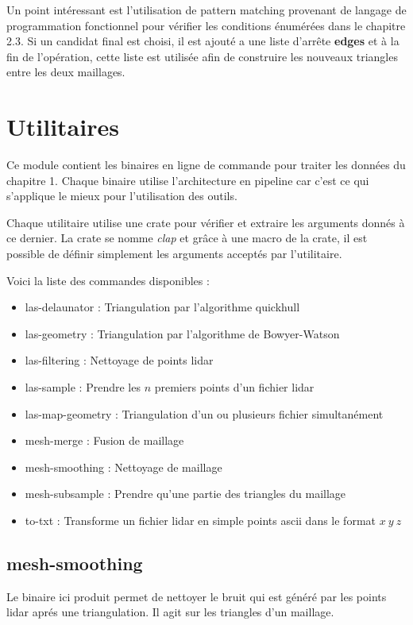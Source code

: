 Un point intéressant est l'utilisation de pattern matching provenant de langage de programmation fonctionnel pour vérifier les conditions énumérées dans le chapitre 2.3. Si un candidat final est choisi, il est ajouté a une liste d'arrête \textbf{edges} et à la fin de l'opération, cette liste est utilisée afin de construire les nouveaux triangles entre les deux maillages.

\section{Utilitaires}

Ce module contient les binaires en ligne de commande pour traiter les données du
chapitre 1.
Chaque binaire utilise l'architecture en pipeline car c'est ce qui s'applique le
mieux pour l'utilisation des outils.

Chaque utilitaire utilise une crate pour vérifier et extraire les arguments
donnés à ce dernier. La crate se nomme \textit{clap} et grâce à une macro de la
crate, il est possible de définir simplement les arguments acceptés par 
l'utilitaire.

Voici la liste des commandes disponibles :
\begin{itemize}
	\item las-delaunator : Triangulation par l'algorithme quickhull
	\item las-geometry : Triangulation par l'algorithme de Bowyer-Watson
	\item las-filtering : Nettoyage de points lidar
	\item las-sample : Prendre les $n$ premiers points d'un fichier lidar
	\item las-map-geometry : Triangulation d'un ou plusieurs fichier
		simultanément
	\item mesh-merge : Fusion de maillage
	\item mesh-smoothing : Nettoyage de maillage
	\item mesh-subsample : Prendre qu'une partie des triangles du maillage
	\item to-txt : Transforme un fichier lidar en simple points ascii dans le
		format $x\ y\ z$
\end{itemize}

\subsection{mesh-smoothing}

Le binaire ici produit permet de nettoyer le bruit qui est généré par les points
lidar aprés une triangulation. Il agit sur les triangles d'un maillage.

